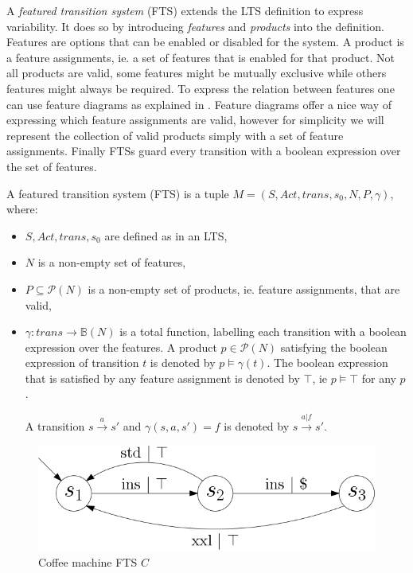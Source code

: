 A \textit{featured transition system} (FTS) extends the LTS definition to express variability. It does so by introducing \textit{features} and \textit{products} into the definition. Features are options that can be enabled or disabled for the system. A product is a feature assignments, ie. a set of features that is enabled for that product. Not all products are valid, some features might be mutually exclusive while others features might always be required. To express the relation between features one can use feature diagrams as explained in \cite{Classen2013FeaturedTS}. Feature diagrams offer a nice way of expressing which feature assignments are valid, however for simplicity we will represent the collection of valid products simply with a set of feature assignments. Finally FTSs guard every transition with a boolean expression over the set of features.
\begin{definition}
	\label{def_fts}\cite{Classen2013FeaturedTS} A featured transition system (FTS) is a tuple $M = (S, Act, trans, s_0, N, P, \gamma)$, where:
	\begin{itemize}
		\item $S, Act, trans, s_0$ are defined as in an LTS,
		\item $N$ is a non-empty set of features,
		\item $P \subseteq \mathcal{P}(N)$ is a non-empty set of products, ie. feature assignments, that are valid,
		\item $\gamma : trans \rightarrow \mathbb{B}(N)$ is a total function, labelling each transition with a boolean expression over the features. A product $p \in \mathcal{P}(N)$ satisfying the boolean expression of transition $t$ is denoted by $p \models \gamma(t)$. The boolean expression that is satisfied by any feature assignment is denoted by $\top$, ie $p \models \top$ for any $p$.
		
		A transition $s \xrightarrow a s'$ and $\gamma(s,a,s') = f$ is denoted by $s \xrightarrow {a | f} s'$. 
	\end{itemize}
\end{definition}
\begin{figure}[h]
\centering
\includegraphics[scale=0.3]{Examples/CoffeeMachine/FTS}
\caption[Coffee machine LTS]{Coffee machine FTS $C$}
\label{fig:coffeemachinefts}
\end{figure}

